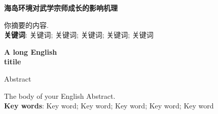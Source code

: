\documentclass[12pt,openany,oneside]{ctexart}       %
\begin{document}



\setcounter{page}{1}                                 %



\pagestyle{plain}

\fontsize{12pt}{18pt}\selectfont
\begin{center} 
	{\fontsize{15.75pt}{13pt}\selectfont\bf 海岛环境对武学宗师成长的影响机理\\ {}  }
\end{center}

\begin{center}
{\fontsize{15.75pt}{13pt}\selectfont{\bf 摘~要}} \vspace{1.0cm}
\end{center}

你摘要的内容.\\
\textbf{\hei 关键词}: 关键词;  关键词;  关键词;  关键词; 关键词

\newpage

\fontsize{12pt}{18pt}\selectfont 
\begin{center} {\fontsize{15.75pt}{13pt}\selectfont\bf
A long English \\ titile}\end{center}
\begin{center}
{\large Abstract} \vspace{1.0cm}
\end{center}
The body of your English Abstract.\\
\textbf{Key words}: Key word; Key word; Key word; Key word; Key word

\newpage
\end{document}
